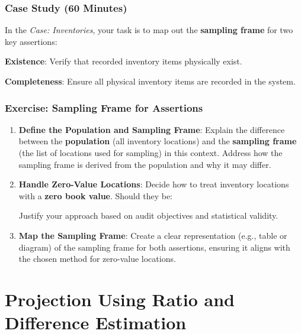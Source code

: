 \documentclass[11pt,a4paper,openany]{memoir}
\begin{document}
\newpage
\subsection*{Case Study (60 Minutes)}
In the \emph{Case: Inventories}, your task is to map out the \textbf{sampling frame} for two key assertions:
\begin{compactitem}
    \item \textbf{Existence}: Verify that recorded inventory items physically exist.
    \item \textbf{Completeness}: Ensure all physical inventory items are recorded in the system.
\end{compactitem}

\subsection*{Exercise: Sampling Frame for Assertions}
\begin{enumerate}
    \item \textbf{Define the Population and Sampling Frame}:
    Explain the difference between the \textbf{population} (all inventory locations) and the \textbf{sampling frame} (the list of locations used for sampling) in this context. Address how the sampling frame is derived from the population and why it may differ.

    \item \textbf{Handle Zero-Value Locations}:
    Decide how to treat inventory locations with a \textbf{zero book value}. Should they be:
    Justify your approach based on audit objectives and statistical validity.

    \item \textbf{Map the Sampling Frame}:
    Create a clear representation (e.g., table or diagram) of the sampling frame for both assertions, ensuring it aligns with the chosen method for zero-value locations.
\end{enumerate}

\chapter{Projection Using Ratio and Difference Estimation}
\end{document}

